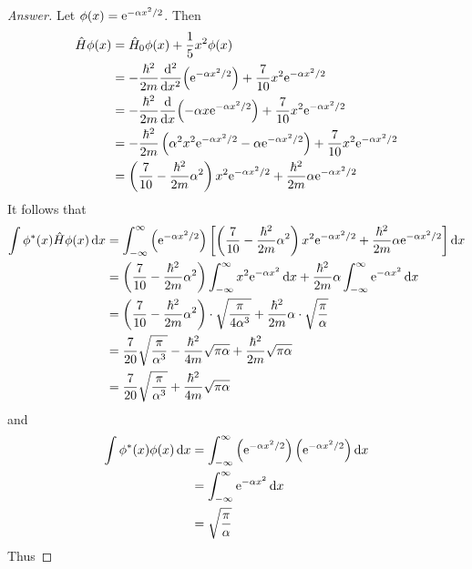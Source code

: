 \documentclass[../psets.tex]{subfiles}
\begin{document}
\begin{enumerate}
\begin{enumerate}
        \begin{proof}[Answer]
            Let $\phi(x)=\e[-\alpha x^2/2]$. Then
            \begin{align*}
                \hat{H}\phi(x) &= \hat{H}_0\phi(x)+\frac{1}{5}x^2\phi(x)\\
                &= -\frac{\hbar^2}{2m}\dv[2]{x}(\e[-\alpha x^2/2])+\frac{7}{10}x^2\e[-\alpha x^2/2]\\
                &= -\frac{\hbar^2}{2m}\dv{x}(-\alpha x\e[-\alpha x^2/2])+\frac{7}{10}x^2\e[-\alpha x^2/2]\\
                &= -\frac{\hbar^2}{2m}\left( \alpha^2x^2\e[-\alpha x^2/2]-\alpha\e[-\alpha x^2/2] \right)+\frac{7}{10}x^2\e[-\alpha x^2/2]\\
                &= \left( \frac{7}{10}-\frac{\hbar^2}{2m}\alpha^2 \right)x^2\e[-\alpha x^2/2]+\frac{\hbar^2}{2m}\alpha\e[-\alpha x^2/2]
            \end{align*}
            It follows that
            \begin{align*}
                \int\phi^*(x)\hat{H}\phi(x)\dd{x} &= \int_{-\infty}^\infty\left( \e[-\alpha x^2/2] \right)\left[ \left( \frac{7}{10}-\frac{\hbar^2}{2m}\alpha^2 \right)x^2\e[-\alpha x^2/2]+\frac{\hbar^2}{2m}\alpha\e[-\alpha x^2/2] \right]\dd{x}\\
                &= \left( \frac{7}{10}-\frac{\hbar^2}{2m}\alpha^2 \right)\int_{-\infty}^\infty x^2\e[-\alpha x^2]\dd{x}+\frac{\hbar^2}{2m}\alpha\int_{-\infty}^\infty\e[-\alpha x^2]\dd{x}\\
                &= \left( \frac{7}{10}-\frac{\hbar^2}{2m}\alpha^2 \right)\cdot\sqrt{\frac{\pi}{4\alpha^3}}+\frac{\hbar^2}{2m}\alpha\cdot\sqrt{\frac{\pi}{\alpha}}\\
                &= \frac{7}{20}\sqrt{\frac{\pi}{\alpha^3}}-\frac{\hbar^2}{4m}\sqrt{\pi\alpha}+\frac{\hbar^2}{2m}\sqrt{\pi\alpha}\\
                &= \frac{7}{20}\sqrt{\frac{\pi}{\alpha^3}}+\frac{\hbar^2}{4m}\sqrt{\pi\alpha}
            \end{align*}
            and
            \begin{align*}
                \int\phi^*(x)\phi(x)\dd{x} &= \int_{-\infty}^\infty\left( \e[-\alpha x^2/2] \right)\left( \e[-\alpha x^2/2] \right)\dd{x}\\
                &= \int_{-\infty}^\infty\e[-\alpha x^2]\dd{x}\\
                &= \sqrt{\frac{\pi}{\alpha}}
            \end{align*}
            Thus

\end{proof}
\end{enumerate}
\end{enumerate}
\end{document}
